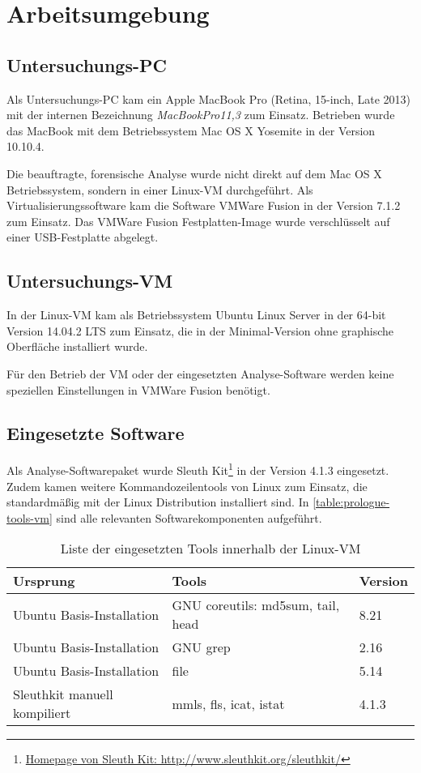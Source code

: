 \section{Arbeitsumgebung}
\label{sec:env}

\subsection{Untersuchungs-PC}
Als Untersuchungs-PC kam ein Apple MacBook Pro (Retina, 15-inch, Late 2013) mit der  internen Bezeichnung \textit{MacBookPro11,3} zum Einsatz. Betrieben wurde das MacBook mit dem Betriebssystem Mac OS X Yosemite in der Version 10.10.4.

Die beauftragte, forensische Analyse wurde nicht direkt auf dem Mac OS X Betriebssystem, sondern in einer Linux-VM durchgeführt. Als Virtualisierungssoftware kam die Software VMWare Fusion in der Version 7.1.2 zum Einsatz. Das VMWare Fusion Festplatten-Image wurde verschlüsselt auf einer USB-Festplatte abgelegt.

\subsection{Untersuchungs-VM}

In der Linux-VM kam als Betriebssystem Ubuntu Linux Server in der 64-bit Version 14.04.2 LTS zum Einsatz, die in der Minimal-Version ohne graphische Oberfläche installiert wurde. 

Für den Betrieb der VM oder der eingesetzten Analyse-Software werden keine speziellen Einstellungen in VMWare Fusion benötigt.

\subsection{Eingesetzte Software}

Als Analyse-Softwarepaket wurde Sleuth Kit\footnote{\href{http://www.sleuthkit.org/sleuthkit/}{Homepage von Sleuth Kit: http://www.sleuthkit.org/sleuthkit/}} in der Version 4.1.3 eingesetzt. Zudem kamen weitere Kommandozeilentools von Linux zum Einsatz, die standardmäßig mit der Linux Distribution installiert sind. In \autoref{table:prologue-tools-vm} sind alle relevanten Softwarekomponenten aufgeführt.

\begin{table}[H]
\centering
\begin{tabular}{lll}
\toprule
Ursprung & Tools & Version \\ 
\midrule
Ubuntu Basis-Installation & GNU coreutils: md5sum, tail, head & 8.21 \\ 
Ubuntu Basis-Installation & GNU grep & 2.16 \\ 
Ubuntu Basis-Installation & file & 5.14 \\ 
Sleuthkit manuell kompiliert & mmls, fls, icat, istat & 4.1.3 \\ 
\bottomrule
\end{tabular} 
\caption{Liste der eingesetzten Tools innerhalb der Linux-VM}
\label{table:prologue-tools-vm}
\end{table}

